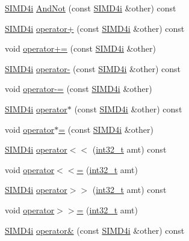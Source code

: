 \begin{DoxyCompactItemize}
\item 
\hyperlink{class_s_i_m_d4i}{S\+I\+M\+D4i} \hyperlink{class_s_i_m_d4i_a0f1acd42f98dec47823cd81745bfc19d}{And\+Not} (const \hyperlink{class_s_i_m_d4i}{S\+I\+M\+D4i} \&other) const 
\item 
\hyperlink{class_s_i_m_d4i}{S\+I\+M\+D4i} \hyperlink{class_s_i_m_d4i_a3aef1f1536aa90880c303ea416289fb2}{operator+} (const \hyperlink{class_s_i_m_d4i}{S\+I\+M\+D4i} \&other) const 
\item 
void \hyperlink{class_s_i_m_d4i_a3321916006dbe9e44e59ddad40d3dd6c}{operator+=} (const \hyperlink{class_s_i_m_d4i}{S\+I\+M\+D4i} \&other)
\item 
\hyperlink{class_s_i_m_d4i}{S\+I\+M\+D4i} \hyperlink{class_s_i_m_d4i_a1c9112942d58194cd619ba474187b2d5}{operator-\/} (const \hyperlink{class_s_i_m_d4i}{S\+I\+M\+D4i} \&other) const 
\item 
void \hyperlink{class_s_i_m_d4i_a65a7fa9a69b0c918a73246c0d70acad5}{operator-\/=} (const \hyperlink{class_s_i_m_d4i}{S\+I\+M\+D4i} \&other)
\item 
\hyperlink{class_s_i_m_d4i}{S\+I\+M\+D4i} \hyperlink{class_s_i_m_d4i_adb18fff517c987f0d33aa7f0de198dc0}{operator$\ast$} (const \hyperlink{class_s_i_m_d4i}{S\+I\+M\+D4i} \&other) const 
\item 
void \hyperlink{class_s_i_m_d4i_a079177538e241a59bcacc67882ae17c1}{operator$\ast$=} (const \hyperlink{class_s_i_m_d4i}{S\+I\+M\+D4i} \&other)
\item 
\hyperlink{class_s_i_m_d4i}{S\+I\+M\+D4i} \hyperlink{class_s_i_m_d4i_a67394911ef17f4d16d53faef4e4ceec6}{operator$<$$<$} (\hyperlink{simddefines_8h_ab1967d8591af1a4e48c37fd2b0f184d0}{int32\+\_\+t} amt) const 
\item 
void \hyperlink{class_s_i_m_d4i_ab8f6b7585d6bf92ec33a539c79b7b7bc}{operator$<$$<$=} (\hyperlink{simddefines_8h_ab1967d8591af1a4e48c37fd2b0f184d0}{int32\+\_\+t} amt)
\item 
\hyperlink{class_s_i_m_d4i}{S\+I\+M\+D4i} \hyperlink{class_s_i_m_d4i_a0baf15484c035758227e81e6a374e6b8}{operator$>$$>$} (\hyperlink{simddefines_8h_ab1967d8591af1a4e48c37fd2b0f184d0}{int32\+\_\+t} amt) const 
\item 
void \hyperlink{class_s_i_m_d4i_a4fd5921769d1b8aa6190ad6a7bb9711c}{operator$>$$>$=} (\hyperlink{simddefines_8h_ab1967d8591af1a4e48c37fd2b0f184d0}{int32\+\_\+t} amt)
\item 
\hyperlink{class_s_i_m_d4i}{S\+I\+M\+D4i} \hyperlink{class_s_i_m_d4i_ae11927964ee93f1d7fdc70200f6c44af}{operator\&} (const \hyperlink{class_s_i_m_d4i}{S\+I\+M\+D4i} \&other) const 

\end{DoxyCompactItemize}
